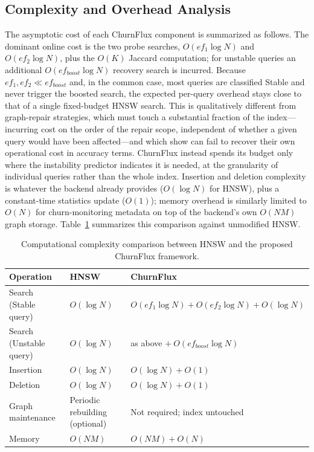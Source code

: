 \documentclass{ieeeaccess}
\begin{document}
\subsection{Complexity and Overhead Analysis}
\label{sec:complexity}
The asymptotic cost of each ChurnFlux component is summarized as follows. The dominant online cost is the two probe searches, $O(ef_1 \log N)$ and $O(ef_2 \log N)$, plus the $O(K)$ Jaccard computation; for unstable queries an additional $O(ef_{boost}\log N)$ recovery search is incurred. Because $ef_1, ef_2 \ll ef_{boost}$ and, in the common case, most queries are classified Stable and never trigger the boosted search, the expected per-query overhead stays close to that of a single fixed-budget HNSW search. This is qualitatively different from graph-repair strategies, which must touch a substantial fraction of the index---incurring cost on the order of the repair scope, independent of whether a given query would have been affected---and which \cite{Mandarapu2026} show can fail to recover their own operational cost in accuracy terms. ChurnFlux instead spends its budget only where the instability predictor indicates it is needed, at the granularity of individual queries rather than the whole index. Insertion and deletion complexity is whatever the backend already provides ($O(\log N)$ for HNSW), plus a constant-time statistics update ($O(1)$); memory overhead is similarly limited to $O(N)$ for churn-monitoring metadata on top of the backend's own $O(NM)$ graph storage. Table~\ref{tab:complexity-body} summarizes this comparison against unmodified HNSW.

\begin{table}[!t]
\renewcommand{\arraystretch}{1.2}
\caption{Computational complexity comparison between HNSW and the proposed ChurnFlux framework.}
\label{tab:complexity-body}
\centering
\begin{tabular}{lll}
\toprule
\textbf{Operation} & \textbf{HNSW} & \textbf{ChurnFlux} \\
\midrule
Search (Stable query) & $O(\log N)$ & $O(ef_1\log N)+O(ef_2\log N)+O(\log N)$ \\
Search (Unstable query) & $O(\log N)$ & as above $+\ O(ef_{boost}\log N)$ \\
Insertion & $O(\log N)$ & $O(\log N)+O(1)$ \\
Deletion & $O(\log N)$ & $O(\log N)+O(1)$ \\
Graph maintenance & Periodic rebuilding (optional) & Not required; index untouched \\
Memory & $O(NM)$ & $O(NM)+O(N)$ \\
\bottomrule
\end{tabular}
\end{table}
\end{document}
